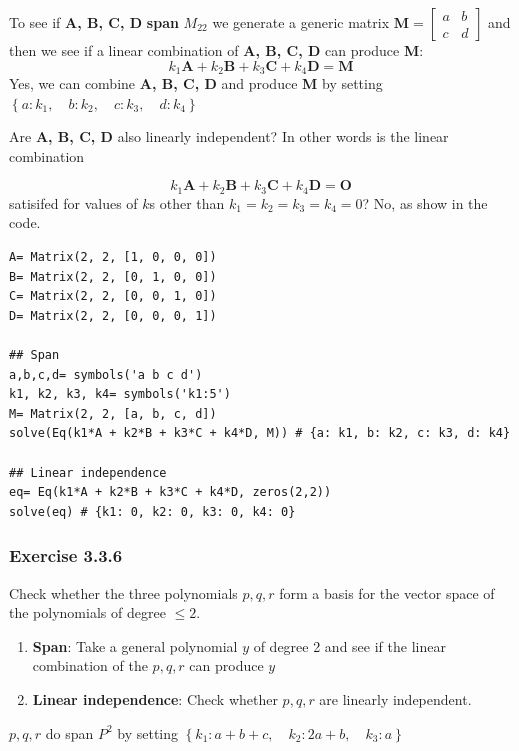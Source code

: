 To see if \textbf{A, B, C, D} \textbf{span} $M_{22}$ we generate a generic matrix
$\mathbf{M}= \left[\begin{matrix}a & b\\c & d\end{matrix}\right]$ and then we
see if a linear combination of \textbf{A, B, C, D} can produce \textbf{M}:
$$
k_1\mathbf{A} + k_2\mathbf{B} + k_3\mathbf{C} + k_4\mathbf{D} = \mathbf{M}
$$
Yes, we can combine \textbf{A, B, C, D} and produce \textbf{M} by setting
$\left \{ a : k_{1}, \quad b : k_{2}, \quad c : k_{3}, \quad d : k_{4}\right \}$

Are \textbf{A, B, C, D} also linearly independent? In other words is the
linear combination

$$
k_1\mathbf{A} + k_2\mathbf{B} + k_3\mathbf{C} + k_4\mathbf{D} = \mathbf{O}
$$
satisifed for values of $k$s other than $k_1=k_2=k_3=k_4=0$? No, as show in the code.

\begin{verbatim}
A= Matrix(2, 2, [1, 0, 0, 0])
B= Matrix(2, 2, [0, 1, 0, 0])
C= Matrix(2, 2, [0, 0, 1, 0])
D= Matrix(2, 2, [0, 0, 0, 1])

## Span
a,b,c,d= symbols('a b c d')
k1, k2, k3, k4= symbols('k1:5')
M= Matrix(2, 2, [a, b, c, d])
solve(Eq(k1*A + k2*B + k3*C + k4*D, M)) # {a: k1, b: k2, c: k3, d: k4}

## Linear independence
eq= Eq(k1*A + k2*B + k3*C + k4*D, zeros(2,2))
solve(eq) # {k1: 0, k2: 0, k3: 0, k4: 0}
\end{verbatim}

\subsubsection{Exercise 3.3.6}

Check whether the three polynomials $p, q, r$ form a basis for the vector space of
the polynomials of degree $\leq 2$.

\begin{enumerate}
\item \textbf{Span}: Take a general polynomial $y$ of degree 2 and see if the linear combination
of the $p, q, r$ can produce $y$
\item \textbf{Linear independence}: Check whether $p, q, r$ are linearly independent.
\end{enumerate}

$p, q, r$ do span $P^2$ by setting
$\left \{ k_{1} : a + b + c, \quad k_{2} : 2 a + b, \quad k_{3} : a\right \}$

